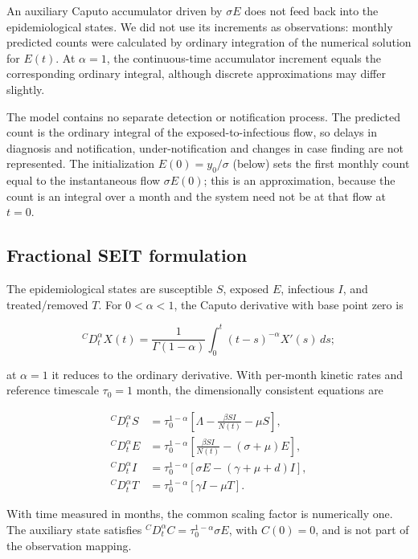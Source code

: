 \documentclass[pdflatex,sn-mathphys-ay,lineno]{sn-jnl}
\begin{document}
An auxiliary Caputo accumulator driven by $\sigma E$ does not feed back into the epidemiological states. We did not use its increments as observations: monthly predicted counts were calculated by ordinary integration of the numerical solution for $E(t)$. At $\alpha=1$, the continuous-time accumulator increment equals the corresponding ordinary integral, although discrete approximations may differ slightly.

The model contains no separate detection or notification process. The predicted count is the ordinary integral of the exposed-to-infectious flow, so delays in diagnosis and notification, under-notification and changes in case finding are not represented. The initialization $E(0)=y_0/\sigma$ (below) sets the first monthly count equal to the instantaneous flow $\sigma E(0)$; this is an approximation, because the count is an integral over a month and the system need not be at that flow at $t=0$.

\subsection{Fractional SEIT formulation}

The epidemiological states are susceptible $S$, exposed $E$, infectious $I$, and treated/removed $T$. For $0<\alpha<1$, the Caputo derivative with base point zero is

\[
{}^C D_t^\alpha X(t)=\frac{1}{\Gamma(1-\alpha)}\int_0^t(t-s)^{-\alpha}X'(s)\,ds;
\]

at $\alpha=1$ it reduces to the ordinary derivative. With per-month kinetic rates and reference timescale $\tau_0=1\text{ month}$, the dimensionally consistent equations are

\[
\begin{aligned}
{}^C D_t^\alpha S &=\tau_0^{1-\alpha}\left[\Lambda-\frac{\beta SI}{N(t)}-\mu S\right],\\
{}^C D_t^\alpha E &=\tau_0^{1-\alpha}\left[\frac{\beta SI}{N(t)}-(\sigma+\mu)E\right],\\
{}^C D_t^\alpha I &=\tau_0^{1-\alpha}\left[\sigma E-(\gamma+\mu+d)I\right],\\
{}^C D_t^\alpha T &=\tau_0^{1-\alpha}\left[\gamma I-\mu T\right].
\end{aligned}
\]

With time measured in months, the common scaling factor is numerically one. The auxiliary state satisfies ${}^C D_t^\alpha C=\tau_0^{1-\alpha}\sigma E$, with $C(0)=0$, and is not part of the observation mapping.
\end{document}
